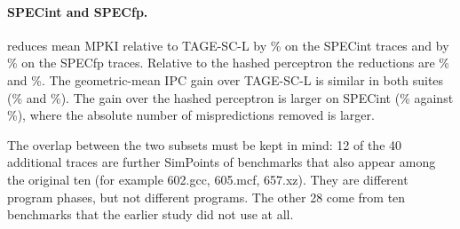 \paragraph{SPECint and SPECfp.} \prop{} reduces mean MPKI relative to TAGE-SC-L by \% on the  SPECint traces and by \% on the  SPECfp traces. Relative to the hashed perceptron the reductions are \% and \%. The geometric-mean IPC gain over TAGE-SC-L is similar in both suites (\% and \%). The gain over the hashed perceptron is larger on SPECint (\% against \%), where the absolute number of mispredictions removed is larger.

The overlap between the two subsets must be kept in mind: 12 of the 40 additional traces are further SimPoints of benchmarks that also appear among the original ten (for example 602.gcc, 605.mcf, 657.xz). They are different program phases, but not different programs. The other 28 come from ten benchmarks that the earlier study did not use at all.
